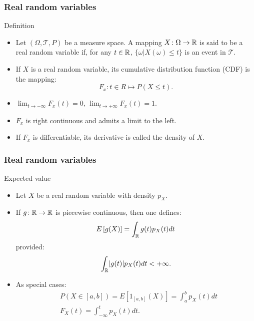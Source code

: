 \documentclass[main.tex]{subfiles}
\begin{document}
\begin{frame}
    \frametitle{Real random variables}
\begin{block}{Definition}
    \begin{itemize}
    \item<+-> Let $\left( \Omega, \mathcal{T}, P \right)$ be a measure space. A mapping $X \colon \Omega \to \mathbb{R}$ is
    said to be a real random variable if, for any $t \in \mathbb{R}$, $\{ \omega \vert X(\omega) \leq t \}$ is an event in $\mathcal{T}.$
    \item<+-> If $X$ is a real random variable, its cumulative distribution function (CDF) is the mapping:
    \begin{equation}
        F_x \colon t \in R \mapsto P\left( X \leq t \right).
    \end{equation}
    \item<+-> $\lim_{t \to -\infty}F_x(t) = 0, \, \lim_{t \to +\infty} F_x(t)=1.$
    \item<+-> $F_x$ is right continuous and admits a limit to the left.
    \item<+-> If $F_x$ is differentiable, its derivative is called the density of $X$.
    \end{itemize}
\end{block}
\end{frame}
\begin{frame}
    \frametitle{Real random variables}
\begin{block}{Expected value}
    \begin{itemize}
    \item<+-> Let $X$ be a real random variable with density $p_X$. 
    \item<+-> If $g \colon \mathbb{R} \to \mathbb{R}$ is piecewise continuous, then one defines:
    \begin{equation}
        E\left[ g(X) \right] = \int_{\mathbb{R}} g(t) p_X(t) dt
    \end{equation} 
    provided:
\begin{equation}
    \int_{\mathbb{R}} \lvert g(t) \rvert p_X(t) dt < +\infty.
\end{equation}
    \item<+-> As special cases:
    \begin{equation}
        \begin{split}
        & P\left( X \in [a,b] \right) = E \left[ 1_{[a,b]}(X) \right] = \int_a^b p_X(t) dt \\
        & F_X(t) = \int_{-\infty}^t p_X(t) dt.
        \end{split}
    \end{equation}
\end{itemize}
\end{block}
\end{frame}
\end{document}
